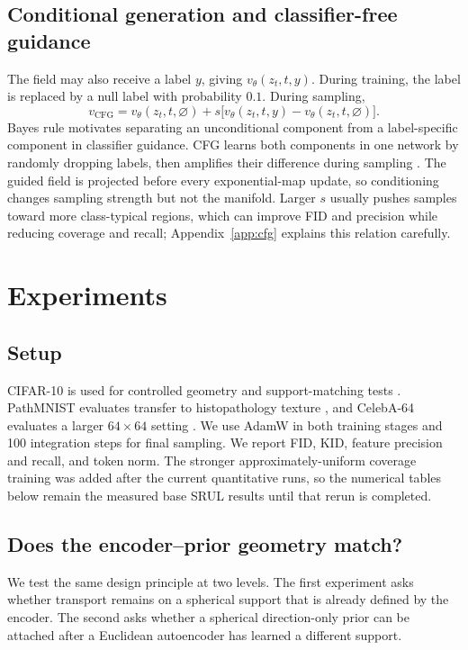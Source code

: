 \documentclass{article}
\begin{document}
\subsection{Conditional generation and classifier-free guidance}
The field may also receive a label $y$, giving $v_\theta(z_t,t,y)$. During training, the label is replaced by a null label with probability $0.1$. During sampling,
\begin{equation}
 v_{\mathrm{CFG}}=v_\theta(z_t,t,\varnothing)
+s\big[v_\theta(z_t,t,y)-v_\theta(z_t,t,\varnothing)\big].
\label{eq:cfg}
\end{equation}
Bayes rule motivates separating an unconditional component from a label-specific component in classifier guidance. CFG learns both components in one network by randomly dropping labels, then amplifies their difference during sampling \cite{cfg}. The guided field is projected before every exponential-map update, so conditioning changes sampling strength but not the manifold. Larger $s$ usually pushes samples toward more class-typical regions, which can improve FID and precision while reducing coverage and recall; Appendix~\ref{app:cfg} explains this relation carefully.

\section{Experiments}
\subsection*{Setup}
CIFAR-10 is used for controlled geometry and support-matching tests \cite{cifar}. PathMNIST evaluates transfer to histopathology texture \cite{medmnist}, and CelebA-64 evaluates a larger $64\times64$ setting \cite{celeba}. We use AdamW in both training stages and 100 integration steps for final sampling. We report FID, KID, feature precision and recall, and token norm. The stronger approximately-uniform coverage training was added after the current quantitative runs, so the numerical tables below remain the measured base SRUL results until that rerun is completed.

\subsection*{Does the encoder--prior geometry match?}
We test the same design principle at two levels. The first experiment asks whether transport remains on a spherical support that is already defined by the encoder. The second asks whether a spherical direction-only prior can be attached after a Euclidean autoencoder has learned a different support.
\end{document}
